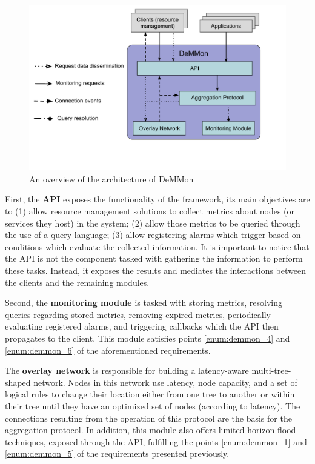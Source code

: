 \begin{figure}[htbp]
    \centering
    \includegraphics[width=\textwidth]{Chapters/Figures/DeMMon-overview.pdf}
    \caption{An overview of the architecture of DeMMon}
    \label{fig:demmon-overview}
\end{figure}
    
First, the \textbf{API} exposes the functionality of the framework, its main objectives are to (1) allow resource management solutions to collect metrics about nodes (or services they host) in the system; (2) allow those metrics to be queried through the use of a query language; (3) allow registering alarms which trigger based on conditions which evaluate the collected information. It is important to notice that the API is not the component tasked with gathering the information to perform these tasks. Instead, it exposes the results and mediates the interactions between the clients and the remaining modules.

Second, the \textbf{monitoring module} is tasked with storing metrics, resolving queries regarding stored metrics, removing expired metrics, periodically evaluating registered alarms, and triggering callbacks which the API then propagates to the client. This module satisfies points \ref{enum:demmon_4} and \ref{enum:demmon_6} of the aforementioned requirements.

The \textbf{overlay network} is responsible for building a latency-aware multi-tree-shaped network. Nodes in this network use latency, node capacity, and a set of logical rules to change their location either from one tree to another or within their tree until they have an optimized set of nodes (according to latency). The connections resulting from the operation of this protocol are the basis for the aggregation protocol. In addition, this module also offers limited horizon flood techniques, exposed through the API, fulfilling the points \ref{enum:demmon_1} and \ref{enum:demmon_5} of the requirements presented previously.

